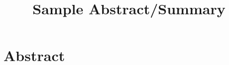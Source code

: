 \documentclass{article}
\title{Sample Abstract/Summary}
\author{}
\date{}
\begin{document}
	
	\maketitle
	
	\section*{Abstract}
	\lipsum[1]
	
	\vspace{0.5cm}
	
    \lipsum[3]
	
\end{document}
